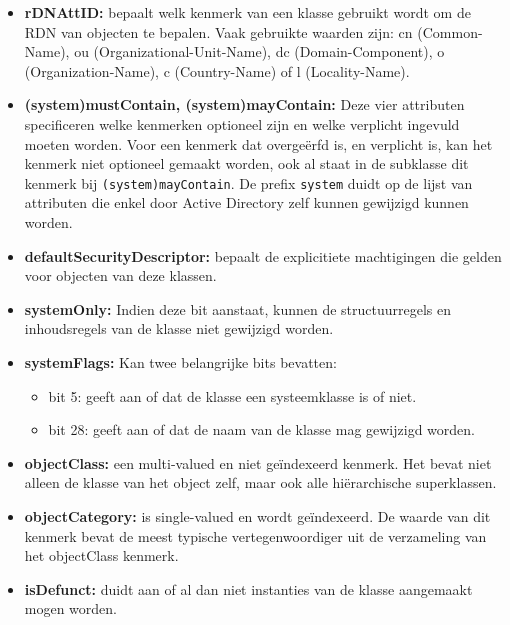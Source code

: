 \documentclass{report}
\begin{document}
\begin{enumerate}
		 { 
			\begin{itemize}
				\item \textbf{rDNAttID:} bepaalt welk kenmerk van een klasse gebruikt wordt om de RDN van objecten te bepalen. Vaak gebruikte waarden zijn: cn (Common-Name), ou (Organizational-Unit-Name), dc (Domain-Component), o (Organization-Name), c (Country-Name) of l (Locality-Name).
				\item \textbf{(system)mustContain, (system)mayContain:} Deze vier attributen specificeren welke kenmerken optioneel zijn en welke verplicht ingevuld moeten worden. Voor een kenmerk dat overgeërfd is, en verplicht is, kan het kenmerk niet optioneel gemaakt worden, ook al staat in de subklasse dit kenmerk bij \texttt{(system)mayContain}. De prefix \texttt{system} duidt op de lijst van attributen die enkel door Active Directory zelf kunnen gewijzigd kunnen worden. 
				\item \textbf{defaultSecurityDescriptor:} bepaalt de explicitiete machtigingen die gelden voor objecten van deze klassen.
				\item \textbf{systemOnly:} Indien deze bit aanstaat, kunnen de structuurregels en inhoudsregels van de klasse niet gewijzigd worden.
				\item \textbf{systemFlags:} Kan twee belangrijke bits bevatten:
					\begin{itemize}
						\item bit 5: geeft aan of dat de klasse een systeemklasse is of niet.
						\item bit 28: geeft aan of dat de naam van de klasse mag gewijzigd worden.
					\end{itemize}
				\item \textbf{objectClass:} een multi-valued en niet geïndexeerd kenmerk. Het bevat niet alleen de klasse van het object zelf, maar ook alle hiërarchische superklassen.
				\item \textbf{objectCategory:} is single-valued en wordt geïndexeerd. De waarde van dit kenmerk bevat de meest typische vertegenwoordiger uit de verzameling van het objectClass kenmerk.
				\item \textbf{isDefunct:} duidt aan of al dan niet instanties van de klasse aangemaakt mogen worden.
			\end{itemize}	
		}
		

\end{enumerate}
\end{document}
